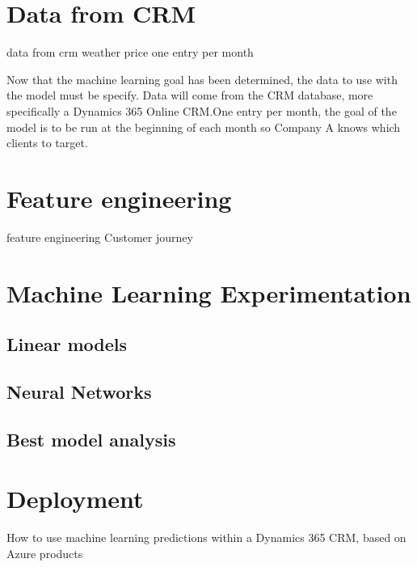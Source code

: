 \section{Data from CRM} \label{sec:crm-data}

data from crm
weather
price
one entry per month

Now that the machine learning goal has been determined, the data to use with the model must be specify. Data will come from the CRM database, more specifically a Dynamics 365 Online CRM.One entry per month, the goal of the model is to be run at the beginning of each month so Company A knows which clients to target.


\section{Feature engineering} \label{sec:ml-features}

feature engineering
Customer journey




\section{Machine Learning Experimentation} \label{sec:ml-experimentation}
\lipsum[1]

\subsection{Linear models}
\lipsum[2]

\subsection{Neural Networks}
\lipsum[3]

\subsection{Best model analysis}
\lipsum[3]


\section{Deployment} \label{sec:crm-deployment}
How to use machine learning predictions within a Dynamics 365 CRM, based on Azure products

